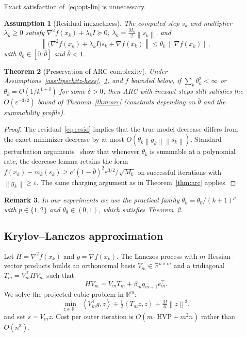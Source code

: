 \documentclass[11pt,a4paper]{article}
\newtheorem{theorem}{Theorem}[section]
\newtheorem{assumption}[theorem]{Assumption}
\newtheorem{remark}[theorem]{Remark}
\newcommand{\R}{\mathbb{R}}
\newcommand{\norm}[1]{\left\|#1\right\|}
\newcommand{\inner}[2]{\left\langle #1,#2\right\rangle}
\newcommand{\grad}{\nabla}
\newcommand{\hess}{\nabla^{2}}
\begin{document}
Exact satisfaction of~\eqref{eq:opt-lin} is unnecessary.

\begin{assumption}[Residual inexactness]
\label{ass:inexact}
The computed step $s_{k}$ and multiplier $\lambda_{k}\ge 0$ satisfy $\hess f(x_{k})+\lambda_{k}I\succeq 0$, $\lambda_{k}=\tfrac{M_{k}}{2}\norm{s_{k}}$, and
\begin{equation}
\label{eq:resid}
\norm{\bigl(\hess f(x_{k})+\lambda_{k}I\bigr)s_{k}+\grad f(x_{k})}
\le
\theta_{k}\,\norm{\grad f(x_{k})},
\end{equation}
with $\theta_{k}\in[0,\bar\theta]$ and $\bar\theta<1$.
\end{assumption}

\begin{theorem}[Preservation of ARC complexity]
\label{thm:inexact}
Under Assumptions~\ref{ass:lipschitz-hess},~\ref{ass:inexact}, and $f$ bounded below, if $\sum_{k}\theta_{k}^{2}<\infty$ or $\theta_{k}=O(1/k^{1+\delta})$ for some $\delta>0$, then ARC with inexact steps still satisfies the $O(\varepsilon^{-3/2})$ bound of Theorem~\ref{thm:arc} (constants depending on $\bar\theta$ and the summability profile).
\end{theorem}

\begin{proof}
The residual~\eqref{eq:resid} implies that the true model decrease differs from the exact-minimizer decrease by at most $O(\theta_{k}\norm{g_{k}}\norm{s_{k}})$.
Standard perturbation arguments~\cite{cartis2011arc,birgin2017worst} show that whenever $\theta_{k}$ is summable at a polynomial rate, the decrease lemma retains the form
$f(x_{k})-m_{k}(s_{k})\ge c'(1-\bar\theta)^{2}\varepsilon^{3/2}/\sqrt{M_{k}}$ on successful iterations with $\norm{g_{k}}\ge\varepsilon$.
The same charging argument as in Theorem~\ref{thm:arc} applies.
\end{proof}

\begin{remark}
In our experiments we use the practical family $\theta_{k}=\theta_{0}/(k+1)^{p}$ with $p\in\{1,2\}$ and $\theta_{0}\in(0,1)$, which satisfies Theorem~\ref{thm:inexact}.
\end{remark}

\subsection{Krylov--Lanczos approximation}

Let $H=\hess f(x_{k})$ and $g=\grad f(x_{k})$.
The Lanczos process with $m$ Hessian--vector products builds an orthonormal basis $V_{m}\in\R^{n\times m}$ and a tridiagonal $T_{m}=V_{m}^{\top}HV_{m}$ such that
\begin{equation}
HV_{m}=V_{m}T_{m}+\beta_{m}q_{m+1}e_{m}^{\top}.
\end{equation}
We solve the projected cubic problem in $\R^{m}$:
\begin{equation}
\min_{z\in\R^{m}}
\;
\inner{V_{m}^{\top}g}{z}
+
\tfrac12\inner{T_{m}z}{z}
+
\tfrac{M}{6}\norm{z}^{3},
\end{equation}
and set $s=V_{m}z$.
Cost per outer iteration is $O(m\cdot\mathrm{HVP}+m^{2}n)$ rather than $O(n^{3})$.
\end{document}
